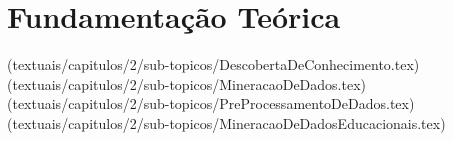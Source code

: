 

\newpage

\chapter{Fundamentação Teórica}
\label{cha:fudamentacao-teorica}

\markright{}

(textuais/capitulos/2/sub-topicos/DescobertaDeConhecimento.tex)
(textuais/capitulos/2/sub-topicos/MineracaoDeDados.tex)
(textuais/capitulos/2/sub-topicos/PreProcessamentoDeDados.tex)
(textuais/capitulos/2/sub-topicos/MineracaoDeDadosEducacionais.tex)

